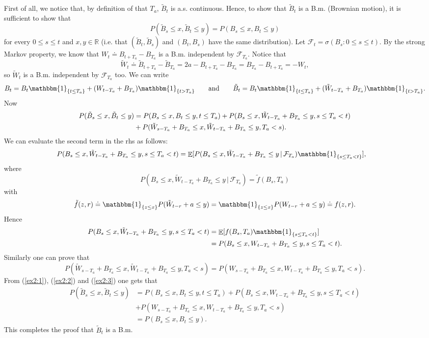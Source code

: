 \documentclass[a4paper,11pt]{article}
\theoremstyle{definition}
\theoremstyle{plain}
\theoremstyle{remark}
\DeclarePairedDelimiter{\parq}{[}{]}
\DeclarePairedDelimiter{\bra}{\lbrace}{\rbrace}
\DeclareMathOperator*{\expval}{\mathbb{E}}
\begin{document}
First of all, we notice that, by definition of that $T_a$, $\tilde{B}_t$ is a.s. continuous. Hence, to show that $\tilde{B}_t$ is a B.m. (Brownian motion), it is sufficient to show that
$$
P(\tilde{B}_s \leq x, \tilde{B}_t \leq y) = P(B_s \leq x, B_t \leq y)
$$
for every $0\leq s\leq t$ and $x,y\in\mathbb{R}$ (i.e. that $(\tilde{B}_t,\tilde{B}_s)$ and $(B_t,B_s)$ have the same distribution). Let $\mathcal{F}_t= \sigma(B_s: 0\leq s \leq t)$. By the strong Markov property, we know that $W_t \doteq B_{t+T_a} - B_{T_a}$ is a B.m. independent by $\mathcal{F}_{T_a}$. Notice that 
$$
\tilde{W}_t \doteq \tilde{B}_{t+T_a} - \tilde{B}_{T_a} = 2a - B_{t+T_a} - B_{T_a} = B_{T_a} - B_{t+T_a} = -W_t,
$$
so $\tilde{W}_t$ is a B.m. independent by $\mathcal{F}_{T_a}$ too. We can write
\begin{align*}
B_t = B_t\mathbbm{1}_{\bra{t\leq T_a}} + (W_{t-T_a} + B_{T_a})\mathbbm{1}_{\bra{t> T_a}} \qquad \text{and} \qquad \tilde{B}_t = B_t\mathbbm{1}_{\bra{t\leq T_a}} + (\tilde{W}_{t-T_a} + B_{T_a})\mathbbm{1}_{\bra{t> T_a}}.
\end{align*}
Now 
\begin{align}
P(\tilde{B}_s \leq x, \tilde{B}_t \leq y) & = P(B_s \leq x, B_t \leq y, t\leq T_a) + P(B_s \leq x, \tilde{W}_{t-T_a} + B_{T_a} \leq y, s\leq T_a<t) \notag \\ & + P(\tilde{W}_{s-T_a} + B_{T_a} \leq x, \tilde{W}_{t-T_a} + B_{T_a} \leq y, T_a<s). \label{ex2:1}
\end{align}
We can evaluate the second term in the rhs as follows:
\begin{align*}
P(B_s \leq x, \tilde{W}_{t-T_a} + B_{T_a} \leq y, s\leq T_a<t) & = \expval\parq{P(B_s \leq x, \tilde{W}_{t-T_a} + B_{T_a} \leq y\,|\,\mathcal{F}_{T_a})\mathbbm{1}_{\bra{s\leq T_a<t}}}, 
\end{align*}
where
$$
P(B_s \leq x, \tilde{W}_{t-T_a} + B_{T_a} \leq y\,|\,\mathcal{F}_{T_a}) = \tilde{f}(B_s,T_a)
$$
with
$$
\tilde{f}(z,r) \doteq \mathbbm{1}_{\bra{z \leq x}} P(\tilde{W}_{t-r} + a \leq y) = \mathbbm{1}_{\bra{z \leq x}} P(W_{t-r} + a \leq y) \doteq f(z,r).
$$
Hence
\begin{align}
P(B_s \leq x, \tilde{W}_{t-T_a} + B_{T_a} \leq y, s\leq T_a<t) & = \expval\parq{f(B_s,T_a)\mathbbm{1}_{\bra{s\leq T_a<t}}} \notag \\ & = P(B_s \leq x, W_{t-T_a} + B_{T_a} \leq y, s\leq T_a<t).\label{ex2:2} 
\end{align}
Similarly one can prove that
\begin{equation}
P(\tilde{W}_{s-T_a} + B_{T_a} \leq x, \tilde{W}_{t-T_a} + B_{T_a} \leq y, T_a<s) = P(W_{s-T_a} + B_{T_a} \leq x, W_{t-T_a} + B_{T_a} \leq y, T_a<s) \label{ex2:3}.
\end{equation}
From (\ref{ex2:1}), (\ref{ex2:2}) and (\ref{ex2:3}) one gets that
\begin{align*}
P(\tilde{B}_s \leq x, \tilde{B}_t \leq y) & = P(B_s \leq x, B_t \leq y, t\leq T_a) + P(B_s \leq x, W_{t-T_a} + B_{T_a} \leq y, s\leq T_a<t) \\ & + P(W_{s-T_a} + B_{T_a} \leq x, W_{t-T_a} + B_{T_a} \leq y, T_a<s) \\ &  = P(B_s \leq x, B_t \leq y).
\end{align*}
This completes the proof that $\tilde{B}_t$ is a B.m.
\end{document}
